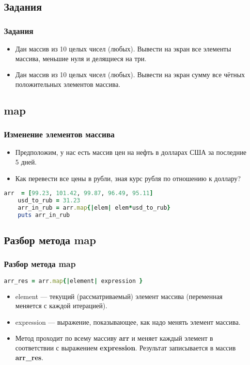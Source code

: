 \documentclass[compress,red]{beamer}
\begin{document}
\subsection{Задания}
\begin{frame}
  \frametitle{Задания}
  \begin{itemize}
    \item Дан массив из 10 целых чисел (любых). Вывести на экран все элементы массива, меньшие нуля и делящиеся на три.
    \item Дан массив из 10 целых чисел (любых). Вывести на экран сумму все чётных положительных элементов массива.
  \end{itemize}
\end{frame}

\subsection{map}
\begin{frame}[fragile]
  \frametitle{Изменение элементов массива}

  \begin{itemize}
    \item Предположим, у нас есть массив цен на нефть в долларах США за последние 5 дней.
    \item Как перевести все цены в рубли, зная курс рубля по отношению к доллару?
  \end{itemize}

  \begin{lstlisting}[language=ruby,basicstyle=\footnotesize,label=ruby9,caption=Метод map]
    arr  = [99.23, 101.42, 99.87, 96.49, 95.11]
    usd_to_rub = 31.23
    arr_in_rub = arr.map{|elem| elem*usd_to_rub}
    puts arr_in_rub
  \end{lstlisting}
  
\end{frame}

\subsection{Разбор метода map}
\begin{frame}[fragile]
  \frametitle{Разбор метода map}
  
  \begin{lstlisting}[language=ruby,basicstyle=\footnotesize,label=ruby10,caption=Общий вид map]
    arr_res = arr.map{|element| expression }
  \end{lstlisting}
  
  \begin{itemize}
    \item element --- текущий (рассматриваемый) элемент массива (переменная меняется с каждой итерацией).
    \item expression --- выражение, показывающее, как надо менять элемент массива.
    \item Метод проходит по всему массиву \textbf{arr} и меняет каждый элемент в соответствии с выражением \textbf{expression}. Результат записывается в массив \textbf{arr\_res}.
  \end{itemize}
  
\end{frame}
\end{document}
